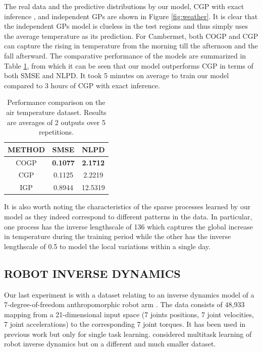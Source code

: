 The real data and the predictive distributions by our model, CGP with exact inference \citep{alvarez-lawrence-nips-08}, and independent GPs are shown in Figure \ref{fig:weather}.
It is clear that the independent GPs model is clueless in the test regions and thus simply uses the average temperature as its prediction.
For Cambermet, both COGP and CGP can capture the rising in temperature from the morning till the afternoon and the fall afterward.
The comparative performance of the models are summarized in Table \ref{tab:air}, from which it can be seen that our model outperforms CGP in terms of both SMSE and NLPD.
It took 5 minutes on average to train our model compared to 3 hours of CGP with exact inference.
%
\setlength{\tabcolsep}{4pt}
\begin{table}[t]
\caption{Performance comparison on the air temperature dataset. Results are averages of 2 outputs over 5 repetitions. }
\label{tab:air}
\begin{center}
\begin{tabular}{ccc}
\toprule
\textbf{METHOD} & \textbf{SMSE} & \textbf{NLPD} \\
\hline
COGP & \textbf{0.1077} & \textbf{2.1712} \\
CGP & 0.1125 & 2.2219 \\
IGP & 0.8944 & 12.5319 \\
\bottomrule
\end{tabular}
\end{center}
\end{table}
%
It is also worth noting the characteristics of the sparse processes learned by our model as they indeed correspond to different patterns in the data.
In particular, one process has the inverse lengthscale of 136 which captures the global increase in temperature during the training period while the other has the inverse lengthscale of 0.5 to model the local variations within a single day.

\subsection{ROBOT INVERSE DYNAMICS}
Our last experiment is with a dataset relating to an inverse dynamics model of a 7-degree-of-freedom anthropomorphic robot arm \citep{vijayakumar2000locally}.
The data consists of 48,933 mapping from a 21-dimensional input space (7 joints positions, 7 joint velocities, 7 joint accelerations) to the corresponding 7 joint torques.
It has been used in previous work \citep[see e.g.][]{rasmussen-williams-book,vijayakumar2000locally} but only for single task learning. 
\citet{chai2008multi} considered multitask learning of robot inverse dynamics  but on a different and much smaller dataset.

